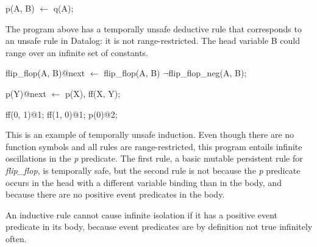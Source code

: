 \begin{example}

\begin{Dedalus}
p(A, B) \(\leftarrow\)
  q(A);
\end{Dedalus}

The program above has a temporally unsafe deductive rule that corresponds to an unsafe rule in Datalog: it is not range-restricted.  
The head variable B could range over an infinite set of constants.
\end{example}


\begin{example}


\begin{Dedalus}
flip_flop(A, B)@next  \(\leftarrow\)
    flip_flop(A, B)
    \(\lnot\)flip_flop_neg(A, B);

p(Y)@next  \(\leftarrow\)
    p(X),
    ff(X, Y);


ff(0, 1)@1;
ff(1, 0)@1;
p(0)@2;

\end{Dedalus}


This is an example of temporally unsafe induction.  Even though there are no function symbols and all rules are range-restricted,
this program entails infinite oscillations in the \emph{p} predicate.  The first rule, a basic mutable persistent rule for \emph{flip\_flop}, is
temporally safe, but the second rule is not because the \emph{p} predicate occurs in the head with a different variable binding than in 
the body, and because there are no positive event predicates in the body. 

\end{example}


An inductive rule cannot cause infinite isolation if it has a positive event predicate in its body, because event predicates
are by definition not true infinitely often.



